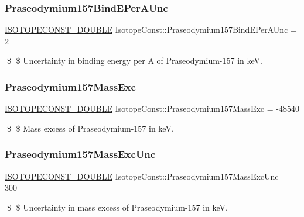 \subsubsection{\texorpdfstring{Praseodymium157\+Bind\+E\+Per\+A\+Unc}{Praseodymium157BindEPerAUnc}}
{\footnotesize\ttfamily \mbox{\hyperlink{group___isotope_const-_macros_ga8f45a7272ce02c0b4c65c44636ed719a}{I\+S\+O\+T\+O\+P\+E\+C\+O\+N\+S\+T\+\_\+\+D\+O\+U\+B\+LE}} Isotope\+Const\+::\+Praseodymium157\+Bind\+E\+Per\+A\+Unc = 2}

\$ \$ Uncertainty in binding energy per A of Praseodymium-\/157 in keV. \mbox{\label{group___isotope_const-_praseodymium-_pr157_ga03d18c3cc95d5371af4fee834433e99d}} 
\subsubsection{\texorpdfstring{Praseodymium157\+Mass\+Exc}{Praseodymium157MassExc}}
{\footnotesize\ttfamily \mbox{\hyperlink{group___isotope_const-_macros_ga8f45a7272ce02c0b4c65c44636ed719a}{I\+S\+O\+T\+O\+P\+E\+C\+O\+N\+S\+T\+\_\+\+D\+O\+U\+B\+LE}} Isotope\+Const\+::\+Praseodymium157\+Mass\+Exc = -\/48540}

\$ \$ Mass excess of Praseodymium-\/157 in keV. \mbox{\label{group___isotope_const-_praseodymium-_pr157_ga0b316557f9404877ff3e65afe2590d24}} 
\subsubsection{\texorpdfstring{Praseodymium157\+Mass\+Exc\+Unc}{Praseodymium157MassExcUnc}}
{\footnotesize\ttfamily \mbox{\hyperlink{group___isotope_const-_macros_ga8f45a7272ce02c0b4c65c44636ed719a}{I\+S\+O\+T\+O\+P\+E\+C\+O\+N\+S\+T\+\_\+\+D\+O\+U\+B\+LE}} Isotope\+Const\+::\+Praseodymium157\+Mass\+Exc\+Unc = 300}

\$ \$ Uncertainty in mass excess of Praseodymium-\/157 in keV. \mbox{\label{group___isotope_const-_praseodymium-_pr157_ga7c3a948fd53a490eca8f394595e952d9}} 
